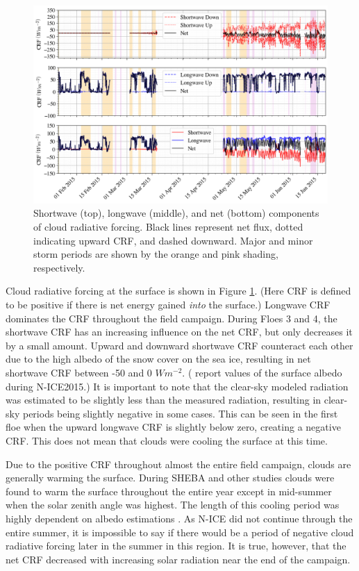 \begin{figure}[t!]
    \centering
    \includegraphics[width=1\linewidth]{figures/chapter4/RadForcing.png}
    \caption[Shortwave, longwave, and net components of cloud radiative forcing.]{Shortwave (top), longwave (middle), and net (bottom) components of cloud radiative forcing. Black lines represent net flux, dotted indicating upward CRF, and dashed downward. Major and minor storm periods are shown by the orange and pink shading, respectively.}
    \label{fig:crf_timeseries}
\end{figure}

Cloud radiative forcing at the surface is shown in Figure \ref{fig:crf_timeseries}. (Here CRF is defined to be positive if there is net energy gained \emph{into} the surface.) Longwave CRF dominates the CRF throughout the field campaign. During Floes 3 and 4, the shortwave CRF has an increasing influence on the net CRF, but only decreases it by a small amount. Upward and downward shortwave CRF counteract each other due to the high albedo of the snow cover on the sea ice, resulting in net shortwave CRF between -50 and 0 $Wm^{-2}$. (\citet{walden:2017} report values of the surface albedo during N-ICE2015.) It is important to note that the clear-sky modeled radiation was estimated to be slightly less than the measured radiation, resulting in clear-sky periods being slightly negative in some cases. This can be seen in the first floe when the upward longwave CRF is slightly below zero, creating a negative CRF. This does not mean that clouds were cooling the surface at this time. 

Due to the positive CRF throughout almost the entire field campaign, clouds are generally warming the surface. During SHEBA and other studies \citep{schweiger:2004, cogley:1984, walsh:1998, curry:1996} clouds were found to warm the surface throughout the entire year except in mid-summer when the solar zenith angle was highest. The length of this cooling period was highly dependent on albedo estimations \citep{intrieri:2002}. As N-ICE did not continue through the entire summer, it is impossible to say if there would be a period of negative cloud radiative forcing later in the summer in this region. It is true, however, that the net CRF decreased with increasing solar radiation near the end of the campaign.

